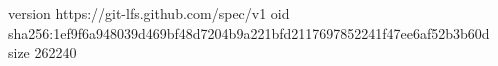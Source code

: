 version https://git-lfs.github.com/spec/v1
oid sha256:1ef9f6a948039d469bf48d7204b9a221bfd2117697852241f47ee6af52b3b60d
size 262240
